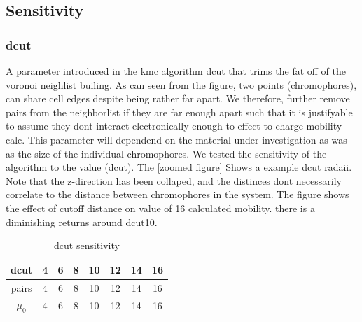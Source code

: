 \subsection{Sensitivity}

\subsubsection{dcut}

A parameter introduced in the kmc algorithm dcut that trims the fat off of the voronoi neighlist builing.
As can seen from the figure, two points (chromophores), can share cell edges despite being rather far apart. We
therefore, further remove pairs from the neighborlist if they are far enough apart such that it is justifyable
to assume they dont interact electronically enough to effect to charge mobility calc. This parameter will
dependend on the material under investigation as was as the size of the individual chromophores. We tested the
sensitivity of the algorithm to the value (dcut). The [zoomed figure] Shows a example dcut radaii. Note that
the z-direction has been collaped, and the distinces dont necessarily correlate to the distance
between chromophores in the system. The figure shows the effect of cutoff distance on value of
16 calculated mobility. there is a diminishing returns around dcut10.


\begin{table}[ht]
    \caption{dcut sensitivity}
\centering %
\begin{tabular}{c c c c c c c c} %
\hline\hline %
dcut & 4 & 6 & 8 & 10 & 12 & 14 & 16 \\ [0.5ex] %
\hline %
 pairs & 4 & 6 & 8 & 10 & 12 & 14 & 16 \\ %
$\mu_{0}$ & 4 & 6 & 8 & 10 & 12 & 14 & 16 \\ [1ex] %
\hline %
\end{tabular}
\label{table:dcut-sense} %
\end{table}


